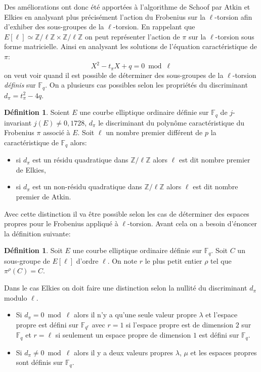 \documentclass[10pt,a4paper]{book}
\theoremstyle{plain}
\theoremstyle{definition}
\theoremstyle{definition}
\theoremstyle{definition}
\theoremstyle{definition}
\newtheorem{defi}[thm]{Définition}
\theoremstyle{remark}
\theoremstyle{remark}
\begin{document}
Des améliorations ont donc été apportées à l'algorithme de Schoof par Atkin et Elkies en analysant plus précisément l'action du Frobenius sur la $\ell$-torsion afin d'exhiber des sous-groupes de la $\ell$-torsion. En  rappelant que $E[\ell] \simeq \mathbb{Z}/\ell \mathbb{Z} \times \mathbb{Z}/\ell \mathbb{Z}$ on peut représenter l'action de $\pi$ sur la $\ell$-torsion sous forme matricielle. Ainsi en analysant les solutions de l'équation caractéristique de $\pi$:
\begin{equation*}
X^2-t_{\pi}X+q = 0 \bmod \ell
\end{equation*} 
on veut voir quand il est possible de déterminer des sous-groupes de la $\ell$-torsion \emph{définis} sur $\mathbb{F}_q$.
On a plusieurs cas possibles selon les propriétés du discriminant $d_{\pi}=t_{\pi}^2-4q$.

\begin{defi}\label{def:dif-Atk-Elk}
Soient $E$ une courbe elliptique ordinaire définie sur $\mathbb{F}_q$ de $j$-invariant $j(E) \neq 0,1728$, $d_{\pi}$ le discriminant du polynôme caractéristique du Frobenius $\pi$ associé à $E$. Soit $\ell$ un nombre premier différent de $p$ la caractéristique de $\mathbb{F}_q$ alors:
\begin{itemize}
\item si $d_{\pi}$ est un résidu quadratique dans $\mathbb{Z}/\ell \mathbb{Z}$ alors $\ell$ est dit nombre premier de Elkies,
\item si $d_{\pi}$ est un non-résidu quadratique dans $\mathbb{Z}/\ell \mathbb{Z}$ alors $\ell$ est dit nombre premier de Atkin.
\end{itemize} 
\end{defi}
	Avec cette distinction il va être possible selon les cas de déterminer des espaces propres pour le Frobenius appliqué à $\ell$-torsion. Avant cela on a besoin d'énoncer la définition suivante:
\begin{defi}
Soit $E$ une courbe elliptique ordinaire définie sur $\mathbb{F}_q$. Soit $C$ un sous-groupe de $E[\ell]$ d'ordre $\ell$. On note $r$ le plus petit entier $\rho$ tel que $\pi^{\rho}(C)=C$.
\end{defi}	
	 
	Dans le cas Elkies on doit faire une distinction selon la nullité du discriminant $d_{\pi}$ modulo $\ell$. 
\begin{itemize}	
	\item Si $d_{\pi}=0 \bmod \ell$ alors il n'y a qu'une seule valeur propre $\lambda$ et l'espace propre est défini sur $\mathbb{F}_{q^r}$ avec $r=1$ si l'espace propre est de dimension $2$ sur $\mathbb{F}_q$ et $r=\ell$ si seulement un espace propre de dimension $1$ est défini sur $\mathbb{F}_q$.
	\item Si $d_{\pi} \neq 0 \bmod \ell$ alors il y a deux valeurs propres $\lambda$, $\mu$ et les espaces propres sont définis sur $\mathbb{F}_q$.
\end{itemize}
\end{document}
